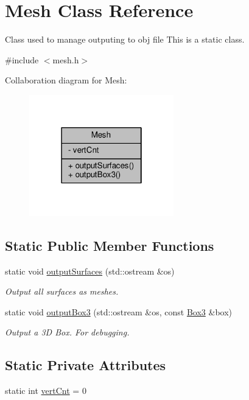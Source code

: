 \hypertarget{classMesh}{}\section{Mesh Class Reference}
\label{classMesh}


Class used to manage outputing to obj file This is a static class.  




{\ttfamily \#include $<$mesh.\+h$>$}



Collaboration diagram for Mesh\+:\nopagebreak
\begin{figure}[H]
\begin{center}
\leavevmode
\includegraphics[width=178pt]{classMesh__coll__graph}
\end{center}
\end{figure}
\subsection*{Static Public Member Functions}
\begin{DoxyCompactItemize}
\item 
static void \hyperlink{classMesh_a054505fe7c3b40ff3d822ecf8b43a156}{output\+Surfaces} (std\+::ostream \&os)
\begin{DoxyCompactList}\small\item\em Output all surfaces as meshes. \end{DoxyCompactList}\item 
static void \hyperlink{classMesh_aae0fa0f7959e6dc362025e3d0ade76b7}{output\+Box3} (std\+::ostream \&os, const \hyperlink{structBox3}{Box3} \&box)
\begin{DoxyCompactList}\small\item\em Output a 3D Box. For debugging. \end{DoxyCompactList}\end{DoxyCompactItemize}
\subsection*{Static Private Attributes}
\begin{DoxyCompactItemize}
\item 
static int \hyperlink{classMesh_a4d39ee3e6f94b387fa5b611e4acdf492}{vert\+Cnt} = 0
\end{DoxyCompactItemize}


